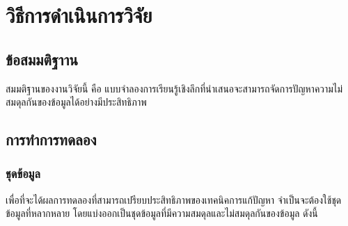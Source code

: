 \chapter{วิธีการดำเนินการวิจัย}
\label{chapter:experiment}

\section{ข้อสมมติฐาาน}
สมมติฐานของงานวิจัยนี้ คือ แบบจำลองการเรียนรู้เชิงลึกที่นำเสนอจะสามารถจัดการปัญหาความไม่สมดุลกันของข้อมูลได้อย่างมีประสิทธิภาพ

\section{การทำการทดลอง}
\subsection{ชุดข้อมูล}
เพื่อที่จะได้ผลการทดลองที่สามารถเปรียบประสิทธิภาพของเทคนิคการแก้ปัญหา จำเป็นจะต้องใช้ชุดข้อมูลที่หลากหลาย โดยแบ่งออกเป็นชุดข้อมูลที่มีความสมดุลและไม่สมดุลกันของข้อมูล ดังนี้

